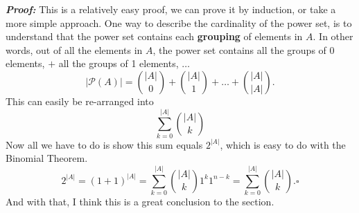 \documentclass{report}
\begin{document}
\textbf{\textit{Proof:}} This is a relatively easy proof, we can prove it by induction, or take a more simple approach. One way to describe the cardinality of the power set, is to understand
that the power set contains each \textbf{grouping} of elements in $A$. In other words, out of all the elements in $A$, the power set contains all the groups of 0 elements, $+$ all the groups of 1 elements, $\dots$
$$|\mathcal{P}(A)| = {|A| \choose 0} + {|A| \choose 1} + \dots + {|A| \choose |A|}.$$
This can easily be re-arranged into $$\sum_{k=0}^{|A|}{|A| \choose k}$$
Now all we have to do is show this sum equals $2^{|A|}$, which is easy to do with the Binomial Theorem.
$$2^{|A|} = (1 + 1)^{|A|} = \sum_{k = 0}^{|A|}{|A| \choose k} 1^k 1^{n-k} = \sum_{k = 0}^{|A|}{|A| \choose k}. \square$$
And with that, I think this is a great conclusion to the section.
\end{document}
